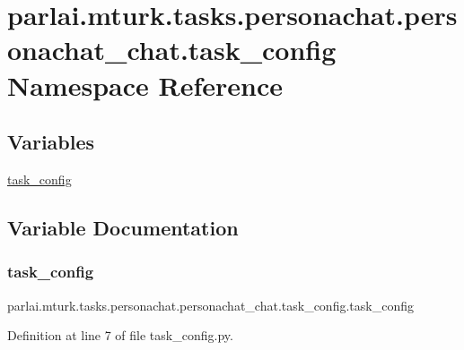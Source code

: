 \hypertarget{namespaceparlai_1_1mturk_1_1tasks_1_1personachat_1_1personachat__chat_1_1task__config}{}\section{parlai.\+mturk.\+tasks.\+personachat.\+personachat\+\_\+chat.\+task\+\_\+config Namespace Reference}
\label{namespaceparlai_1_1mturk_1_1tasks_1_1personachat_1_1personachat__chat_1_1task__config}
\subsection*{Variables}
\begin{DoxyCompactItemize}
\item 
\hyperlink{namespaceparlai_1_1mturk_1_1tasks_1_1personachat_1_1personachat__chat_1_1task__config_a36ade59983bbab74df35e3d22bac11de}{task\+\_\+config}
\end{DoxyCompactItemize}


\subsection{Variable Documentation}
\mbox{\label{namespaceparlai_1_1mturk_1_1tasks_1_1personachat_1_1personachat__chat_1_1task__config_a36ade59983bbab74df35e3d22bac11de}} 
\subsubsection{\texorpdfstring{task\+\_\+config}{task\_config}}
{\footnotesize\ttfamily parlai.\+mturk.\+tasks.\+personachat.\+personachat\+\_\+chat.\+task\+\_\+config.\+task\+\_\+config}



Definition at line 7 of file task\+\_\+config.\+py.

